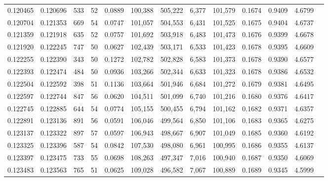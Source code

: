 \begin{tabular}{rrrrrrrrrrrrr}
0.120465 & 0.120696 &   533 &  52 &                                     0.0889 & 100,388 & 505,222 &   6,377 & 101,579 & 0.1674 & 0.9409 & 4.6799 \\
0.120704 & 0.121353 &   669 &  54 &                                     0.0747 & 101,057 & 504,553 &   6,431 & 101,525 & 0.1675 & 0.9404 & 4.6737 \\
0.121359 & 0.121918 &   635 &  52 &                                     0.0757 & 101,692 & 503,918 &   6,483 & 101,473 & 0.1676 & 0.9399 & 4.6678 \\
0.121920 & 0.122245 &   747 &  50 &                                     0.0627 & 102,439 & 503,171 &   6,533 & 101,423 & 0.1678 & 0.9395 & 4.6609 \\
0.122255 & 0.122390 &   343 &  50 &                                     0.1272 & 102,782 & 502,828 &   6,583 & 101,373 & 0.1678 & 0.9390 & 4.6577 \\
0.122393 & 0.122474 &   484 &  50 &                                     0.0936 & 103,266 & 502,344 &   6,633 & 101,323 & 0.1678 & 0.9386 & 4.6532 \\
0.122504 & 0.122592 &   398 &  51 &                                     0.1136 & 103,664 & 501,946 &   6,684 & 101,272 & 0.1679 & 0.9381 & 4.6495 \\
0.122597 & 0.122744 &   847 &  56 &                                     0.0620 & 104,511 & 501,099 &   6,740 & 101,216 & 0.1680 & 0.9376 & 4.6417 \\
0.122745 & 0.122885 &   644 &  54 &                                     0.0774 & 105,155 & 500,455 &   6,794 & 101,162 & 0.1682 & 0.9371 & 4.6357 \\
0.122891 & 0.123136 &   891 &  56 &                                     0.0591 & 106,046 & 499,564 &   6,850 & 101,106 & 0.1683 & 0.9365 & 4.6275 \\
0.123137 & 0.123322 &   897 &  57 &                                     0.0597 & 106,943 & 498,667 &   6,907 & 101,049 & 0.1685 & 0.9360 & 4.6192 \\
0.123325 & 0.123396 &   587 &  54 &                                     0.0842 & 107,530 & 498,080 &   6,961 & 100,995 & 0.1686 & 0.9355 & 4.6137 \\
0.123397 & 0.123475 &   733 &  55 &                                     0.0698 & 108,263 & 497,347 &   7,016 & 100,940 & 0.1687 & 0.9350 & 4.6069 \\
0.123483 & 0.123563 &   765 &  51 &                                     0.0625 & 109,028 & 496,582 &   7,067 & 100,889 & 0.1689 & 0.9345 & 4.5999 \\

\end{tabular}
